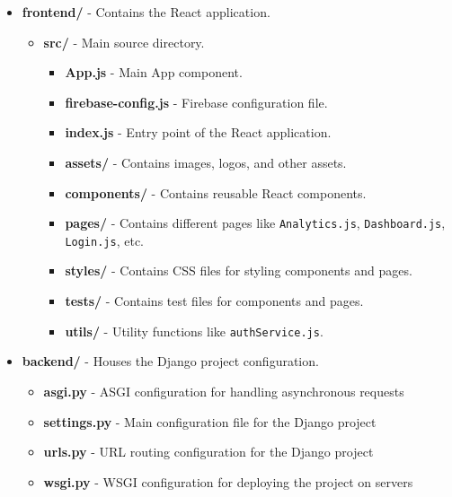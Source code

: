 \documentclass[a4paper,12pt]{article}
\begin{document}
\begin{itemize}
    \item \textbf{frontend/} - Contains the React application.
    \begin{itemize}
        \item \textbf{src/} - Main source directory.
        \begin{itemize}
            \item \textbf{App.js} - Main App component.
            \item \textbf{firebase-config.js} - Firebase configuration file.
            \item \textbf{index.js} - Entry point of the React application.
            \item \textbf{assets/} - Contains images, logos, and other assets.
            \item \textbf{components/} - Contains reusable React components.
            \item \textbf{pages/} - Contains different pages like \texttt{Analytics.js}, \texttt{Dashboard.js}, \texttt{Login.js}, etc.
            \item \textbf{styles/} - Contains CSS files for styling components and pages.
            \item \textbf{tests/} - Contains test files for components and pages.
            \item \textbf{utils/} - Utility functions like \texttt{authService.js}.
        \end{itemize}
    \end{itemize}
    
    \item \textbf{backend/} - Houses the Django project configuration.
    \begin{itemize}
        \item \textbf{asgi.py} - ASGI configuration for handling asynchronous requests
    \item \textbf{settings.py} - Main configuration file for the Django project
    \item \textbf{urls.py} - URL routing configuration for the Django project
    \item \textbf{wsgi.py} - WSGI configuration for deploying the project on servers
    \end{itemize}
    

\end{itemize}
\end{document}
